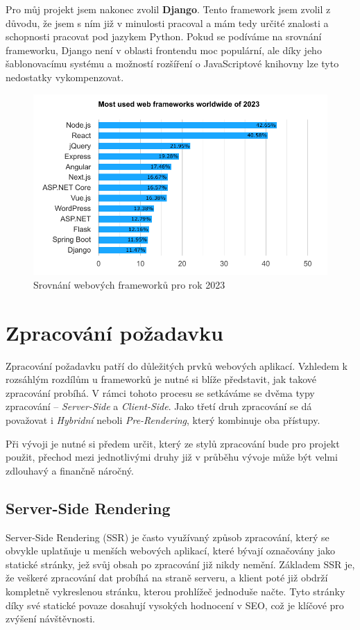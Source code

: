 Pro můj projekt jsem nakonec zvolil \textbf{Django}. Tento framework jsem zvolil z důvodu, že jsem s ním již v minulosti pracoval a mám tedy určité znalosti a schopnosti pracovat pod jazykem Python. Pokud se podíváme na srovnání frameworku, Django není v oblasti frontendu moc populární, ale díky jeho šablonovacímu systému a možností rozšíření o JavaScriptové knihovny lze tyto nedostatky vykompenzovat.

\begin{figure}[H]
    \centering
    \includegraphics{diagrams/frameworkGraphs}
    \caption{Srovnání webových frameworků pro rok 2023 \cite{framework_comparison}}
    \label{fig:framework_comparison}
\end{figure}

\section{Zpracování požadavku}
\label{sec:dev-request-processing}
Zpracování požadavku patří do důležitých prvků webových aplikací. Vzhledem k rozsáhlým rozdílům u frameworků je nutné si blíže představit, jak takové zpracování probíhá. V rámci tohoto procesu se setkáváme se dvěma typy zpracování -- \textit{Server-Side} a \textit{Client-Side}. Jako třetí druh zpracování se dá považovat i \textit{Hybridní} neboli \textit{Pre-Rendering}, který kombinuje oba přístupy.

Při vývoji je nutné si předem určit, který ze stylů zpracování bude pro projekt použit, přechod mezi jednotlivými druhy již v průběhu vývoje může být velmi zdlouhavý a finančně náročný. \cite{request_processing}

\subsection{Server-Side Rendering}
\label{subsec:dev-request-processing-server-side-rendering}
Server-Side Rendering (SSR) je často využívaný způsob zpracování, který se obvykle uplatňuje u menších webových aplikací, které bývají označovány jako statické stránky, jež svůj obsah po zpracování již nikdy nemění. Základem SSR je, že veškeré zpracování dat probíhá na straně serveru, a klient poté již obdrží kompletně vykreslenou stránku, kterou prohlížeč jednoduše načte. Tyto stránky díky své statické povaze dosahují vysokých hodnocení v SEO, což je klíčové pro zvýšení návštěvnosti.

